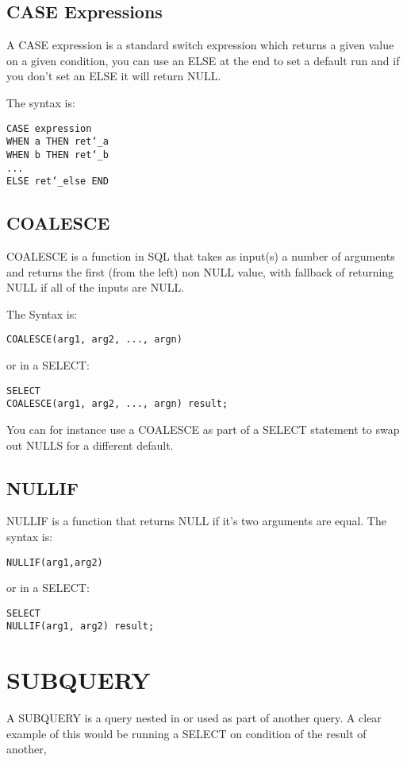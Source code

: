 \documentclass[10pt, english]{article}
\begin{document}
\subsection{CASE Expressions}
A CASE expression is a standard switch expression which returns a given value on a given condition, you can use an ELSE at the end to set a default run 
and if you don't set an ELSE it will return NULL.

The syntax is:

\texttt{CASE expression \\
\hspace*{10pt} WHEN a THEN ret\char`_a \\
\hspace*{10pt} WHEN b THEN ret\char`_b \\
... \\
\hspace*{10pt} ELSE ret\char`_else
END
}

\subsection{COALESCE}
COALESCE is a function in SQL that takes as input(s) a number of arguments and returns the first (from the left) non NULL value, with fallback of returning NULL if 
all of the inputs are NULL. 

The Syntax is:

\texttt{COALESCE(arg1, arg2, ..., argn)}

or in a SELECT:

\texttt{SELECT \\
\hspace*{10pt} COALESCE(arg1, arg2, ..., argn) result;}


You can for instance use a COALESCE as part of a SELECT statement to swap out NULLS for a different default.

\subsection{NULLIF}
NULLIF is a function that returns NULL if it's two arguments are equal. The syntax is:

\texttt{NULLIF(arg1,arg2)}

or in a SELECT:

\texttt{SELECT \\
\hspace*{10pt} NULLIF(arg1, arg2) result;}

\section{SUBQUERY}
A SUBQUERY is a query nested in or used as part of another query. A clear example of this would be running a SELECT on condition of the result of another, 
\end{document}
